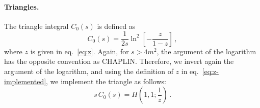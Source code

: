 \documentclass[12pt,a4wide]{article}
\begin{document}
\paragraph{Triangles.} The triangle integral $C_0(s)$ is defined as
\begin{equation}
  \label{eq:triangle}
  C_0(s) = \frac{1}{2s}\ln^2\left[-\frac{z}{1-z}\right]\,,
\end{equation}
where $z$ is given in eq.~\eqref{eq:z}. Again, for $s>4m^2$, the argument of the logarithm has the opposite convention as CHAPLIN. Therefore, we invert again the argument of the logarithm, and using the definition of $z$ in eq.~\eqref{eq:z-implemented}, we implement the triangle as follows:
\begin{equation}
  \label{eq:triangle-HPL}
  s\,C_0(s) = H\left(1,1;\frac{1}{z}\right)\,.
\end{equation}
\end{document}
